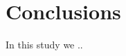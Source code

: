 \documentclass{sig-alternate}
\begin{document}
\begin{comment}
We can reject the null
hypothesis $H0 _{PST}$ considering all tasks in both Groups A
and B (p-value=0.000036 and 0.00005 respectively).
The effect size is medium (0.51 and 0.55) for both
groups.
\end{comment}



\begin{comment}
We report on the effect of layout on accuracy and speed in all task categories as
well as in each of the six task categories. Effect size is
also reported using Cohen's d for accuracy and speed to
facilitate easy comparison to other studies. 
\end{comment}



\begin{comment}
\begin{itemize}
\item  implementation of other SQM based TCP technique.
\item code coverage extraction tool.
\item Faulty versions

There are several validity threats to the design of this study.
Our choice of..
should of course..
this would allow.....would give...

During data collection we mostly used a...

Another threat to the data collection is that our chosen...

did not always fit..

Since we had no...
\end{comment}


\section{Conclusions}
In this study we ..


%

%
%
\end{document}
